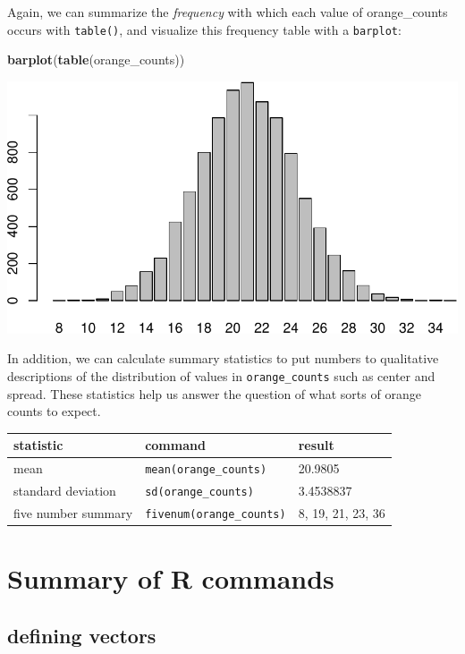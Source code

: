 \documentclass[
]{book}
\newenvironment{Shaded}{\begin{snugshade}}{\end{snugshade}}
\newcommand{\FunctionTok}[1]{\textcolor[rgb]{0.13,0.29,0.53}{\textbf{#1}}}
\newcommand{\NormalTok}[1]{#1}
\theoremstyle{definition}
\theoremstyle{definition}
\theoremstyle{definition}
\theoremstyle{definition}
\theoremstyle{remark}
\begin{document}
Again, we can summarize the \emph{frequency} with which each value of orange\_counts occurs with \texttt{table()}, and visualize this frequency table with a \texttt{barplot}:

\begin{Shaded}
\begin{Highlighting}[]
\FunctionTok{barplot}\NormalTok{(}\FunctionTok{table}\NormalTok{(orange\_counts))}
\end{Highlighting}
\end{Shaded}

\includegraphics{math340-notes_files/figure-latex/unnamed-chunk-90-1.pdf}

In addition, we can calculate summary statistics to put numbers to qualitative descriptions of the distribution of values in \texttt{orange\_counts} such as center and spread. These statistics help us answer the question of what sorts of orange counts to expect.

\begin{longtable}[]{@{}lll@{}}
\toprule\noalign{}
statistic & command & result \\
\midrule\noalign{}
\endhead
\bottomrule\noalign{}
\endlastfoot
mean & \texttt{mean(orange\_counts)} & 20.9805 \\
standard deviation & \texttt{sd(orange\_counts)} & 3.4538837 \\
five number summary & \texttt{fivenum(orange\_counts)} & 8, 19, 21, 23, 36 \\
\end{longtable}

\section{Summary of R commands}\label{sampling-commands}

\subsection*{defining vectors}\label{defining-vectors}
\end{document}
